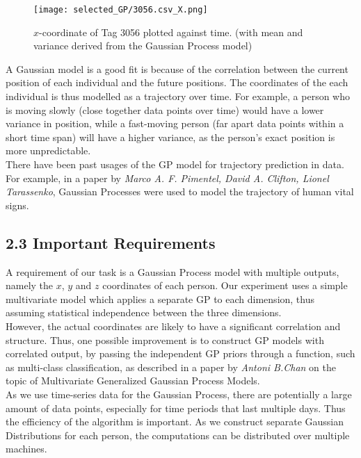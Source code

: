 \documentclass[letterpaper]{article}
\begin{document}
\begin{figure}[!h]
  \centering
    \texttt{[image: selected\_GP/3056.csv\_X.png]}
  \caption{$x$-coordinate of Tag 3056 plotted against time. (with mean and variance derived from the Gaussian Process model)}
  \label{fig:GP1}
\end{figure}

A Gaussian model is a good fit is because of the correlation between the current position of each individual and the future positions. The coordinates of the each individual is thus modelled as a trajectory over time. For example, a person who is moving slowly (close together data points over time) would have a lower variance in position, while a fast-moving person (far apart data points within a short time span) will have a higher variance, as the person's exact position is more unpredictable. \\

There have been past usages of the GP model for trajectory prediction in data. For example, in a paper by {\it Marco A. F. Pimentel, David A. Clifton, Lionel Tarassenko}, Gaussian Processes were used to model the trajectory of human vital signs.

\subsection{2.3  Important Requirements}

A requirement of our task is a Gaussian Process model with multiple outputs, namely the $x$, $y$ and $z$ coordinates of each person. Our experiment uses a simple multivariate model which applies a separate GP to each dimension, thus assuming statistical independence between the three dimensions. \\

However, the actual coordinates are likely to have a significant correlation and structure. Thus, one possible improvement is to construct GP models with correlated output, by passing the independent GP priors through a function, such as multi-class classification, as described in a paper by {\it Antoni B.Chan} on the topic of Multivariate Generalized Gaussian Process Models. \\

As we use time-series data for the Gaussian Process, there are potentially a large amount of data points, especially for time periods that last multiple days. Thus the efficiency of the algorithm is important. As we construct separate Gaussian Distributions for each person, the computations can be distributed over multiple machines.
\end{document}
